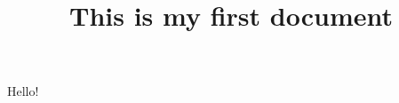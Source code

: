 \documentclass{article}
\title{This is my first document}
\begin{document}
\maketitle
Hello!
\end{document}
